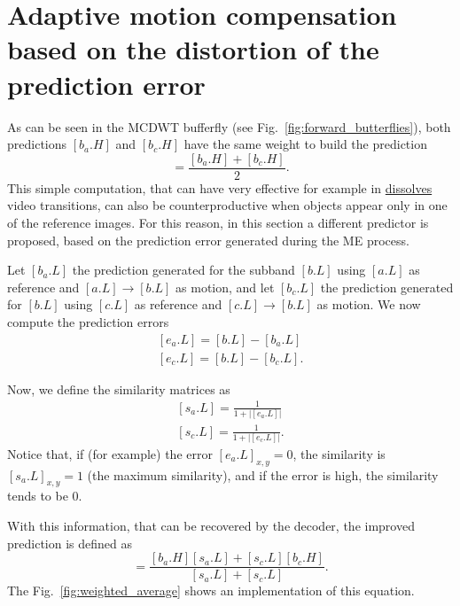 
\section{Adaptive motion compensation based on the distortion of the prediction error}

As can be seen in the MCDWT bufferfly (see
Fig.~\ref{fig:forward_butterflies}), both predictions $[b_a.H]$ and
$[b_c.H]$ have the same weight to build the prediction
\begin{equation}
  [\hat{b.H}] = \frac{[b_a.H] + [b_c.H]}{2}.
\end{equation}
This simple computation, that can have very effective for example in
\href{https://biteable.com/blog/tips/video-transitions-effects-examples/}{dissolves}
video transitions, can also be counterproductive when objects appear
only in one of the reference images. For this reason, in this section
a different predictor is proposed, based on the prediction error
generated during the ME process.

Let $[b_a.L]$ the prediction generated for the subband $[b.L]$ using
$[a.L]$ as reference and $[a.L]\rightarrow [b.L]$ as motion, and let
$[b_c.L]$ the prediction generated for $[b.L]$ using $[c.L]$ as
reference and $[c.L]\rightarrow [b.L]$ as motion. We now compute the
prediction errors
\begin{equation}
  \begin{array}{l}
    {[e_a.L]} = [b.L] - [b_a.L]\\
    {[e_c.L]} = [b.L] - [b_c.L].
  \end{array}
\end{equation}

Now, we define the similarity matrices as
\begin{equation}
  \begin{array}{l}
    {[s_a.L]} = \frac{1}{1+{|[e_a.L]|}}\\
    {[s_c.L]} = \frac{1}{1+{|[e_c.L]|}}.    
  \end{array}
  \label{eq:weighted_prediction}
\end{equation}
Notice that, if (for example) the error $[e_a.L]_{x,y}=0$, the
similarity is $[s_a.L]_{x,y}=1$ (the maximum similarity), and if the
error is high, the similarity tends to be $0$.

With this information, that can be recovered by the decoder, the
improved prediction is defined as
\begin{equation}
  [\hat{b.H}] = \frac{[b_a.H][s_a.L]+[s_c.L][b_c.H]}{[s_a.L]+[s_c.L]}.
\end{equation}
The Fig.~\ref{fig:weighted_average} shows an implementation of this
equation.

